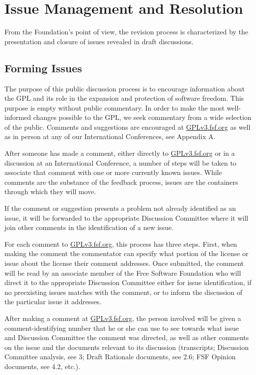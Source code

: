 \chapter{Issue Management and Resolution}


From the Foundation's point of view, the revision process is characterized
by the presentation and closure of issues revealed in draft discussions.

\section{Forming Issues}

The purpose of this public discussion process is to encourage information
about the GPL and its role in the expansion and protection of software
freedom. This purpose is empty without public commentary. In order to
make the most well-informed changes possible to the GPL, we seek commentary
from a wide selection of the public. Comments and suggestions
are encouraged at \url{GPLv3.fsf.org} as well as in person at any of our
International Conferences, see Appendix A.

After someone has made a comment, either directly to \url{GPLv3.fsf.org}
or in a discussion at an International Conference, a number of steps will be
taken to associate that comment with one or more currently known issues.
While comments are the substance of the feedback process, issues are
the containers through which they will move.

If the comment or suggestion presents a problem not already identified
as an issue, it will be forwarded to the appropriate Discussion Committee
where it will join other comments in the identification of a new issue.

For each comment to \url{GPLv3.fsf.org}, this process has three steps.
First, when making the comment the commentator can specify what portion
of the license or issue about the license their comment addresses.
Once submitted, the comment will be read by an associate member of the
Free Software Foundation who will direct it to the appropriate Discussion
Committee either for issue identification, if no preexisting issues matches
with the comment, or to inform the discussion of the particular issue it
addresses.

After making a comment at \url{GPLv3.fsf.org}, the person involved will
be given a comment-identifying number that he or she can use to see
towards what issue and Discussion Committee the comment was directed,
as well as other comments on the issue and the documents relevant to
its discussion (transcripts; Discussion Committee analysis, see 3; Draft
Rationale documents, see 2.6; FSF Opinion documents, see 4.2, etc.).


